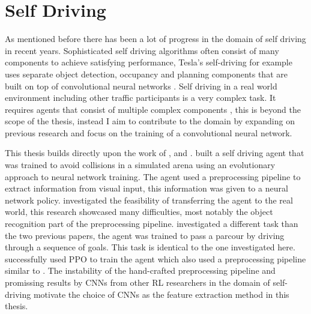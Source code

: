 

\section{Self Driving}

As mentioned before there has been a lot of progress in the domain of self driving in recent years. Sophisticated self driving algorithms often consist of many components to achieve satisfying performance, Tesla's self-driving for example uses separate object detection, occupancy and planning components that are built on top of convolutional neural networks \autocite{howteslaautopilot}. %
Self driving in a real world environment including other traffic participants is a very complex task. It requires agents that consist of multiple complex components \autocite{drl_for_ad}, this is beyond the scope of the thesis, instead I aim to contribute to the domain by expanding on previous research and focus on the training of a convolutional neural network. 

This thesis builds directly upon the work of \autocite{jonas_koenig}, \autocite{merlin_flach} and \autocite{maximilian}. \autocite{jonas_koenig} built a self driving agent that was trained to avoid collisions in a simulated arena using an evolutionary approach to neural network training. The agent used a preprocessing pipeline to extract information from visual input, this information was given to a neural network policy. \autocite{merlin_flach} investigated the feasibility of transferring the agent to the real world, this research showcased many difficulties, most notably the object recognition part of the preprocessing pipeline. \autocite{maximilian} investigated a different task than the two previous papers, the agent was trained to pass a parcour by driving through a sequence of goals. This task is identical to the one investigated here. \autocite{maximilian} successfully used PPO to train the agent which also used a preprocessing pipeline similar to \autocite{jonas_koenig}.
The instability of the hand-crafted preprocessing pipeline and promissing results by CNNs from other RL researchers in the domain of self-driving \autocite{neptune} motivate the choice of CNNs as the feature extraction method in this thesis. 



